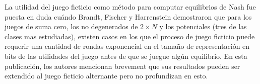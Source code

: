La utilidad del juego ficticio como método para computar equilibrios de Nash fue puesta en duda cuándo Brandt, Fischer y Harrenstein \cite{brandt:rate:convergence} demostraron que para los juegos de suma cero, los no degenerados de $2 \times N$ y los potenciales (tres de las clases mas estudiadas), existen casos en los que el proceso de juego ficticio puede requerir una cantidad de rondas exponencial en el tamaño de representación en bits de las utilidades del juego antes de que se juegue algún equilibrio. En esta publicación, los autores mencionan brevement que sus resultados pueden ser extendido al juego ficticio alternante pero no profundizan en esto.